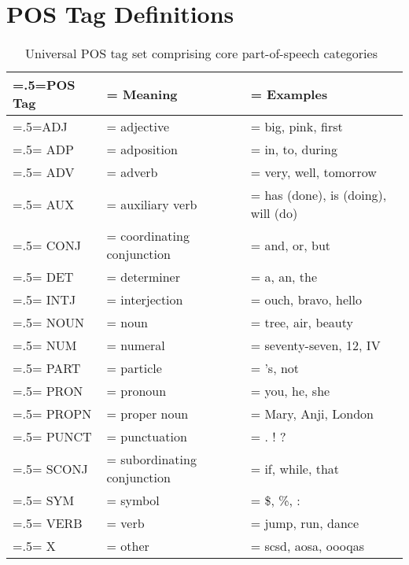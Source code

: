 \chapter{POS Tag Definitions}

\begin{table}[H]
    \centering
    \renewcommand{\arraystretch}{1.25}
    \begin{tabularx}{\textwidth}{|>{\hsize=.5\hsize\linewidth=\hsize}X|>{\hsize=1.0\hsize\linewidth=\hsize}X|>{\hsize=1.5\hsize\linewidth=\hsize}X|} 
     \hline
      \textbf{POS Tag} & \textbf{Meaning} & \textbf{Examples} \\
     \hline
        ADJ & adjective & big, pink, first  \\
        \hline
        ADP & adposition & in, to, during \\
        \hline
        ADV & adverb & very, well, tomorrow \\
        \hline
        AUX & auxiliary verb & has (done), is (doing), will (do) \\
        \hline
        CONJ & coordinating conjunction & and, or, but \\
        \hline
        DET & determiner &  a, an, the \\
        \hline
        INTJ & interjection &  ouch, bravo, hello \\
        \hline
        NOUN & noun & tree, air, beauty \\
        \hline
        NUM & numeral &  seventy-seven, 12, IV \\
        \hline
        PART & particle & 's, not \\
        \hline
        PRON & pronoun & you, he, she \\
        \hline
        PROPN & proper noun & Mary, Anji, London \\
        \hline
        PUNCT & punctuation & . ! ? \\
        \hline
        SCONJ & subordinating conjunction & if, while, that \\
        \hline
        SYM & symbol & \$, \%, : \\
        \hline
        VERB & verb & jump, run, dance \\
        \hline
        X & other & scsd, aosa, oooqas \\
    \hline
    \end{tabularx}
    \caption{Universal POS tag set comprising core part-of-speech categories~\cite{universal_pos_tags}}
    \label{appendix:pos}
    \end{table}
    
